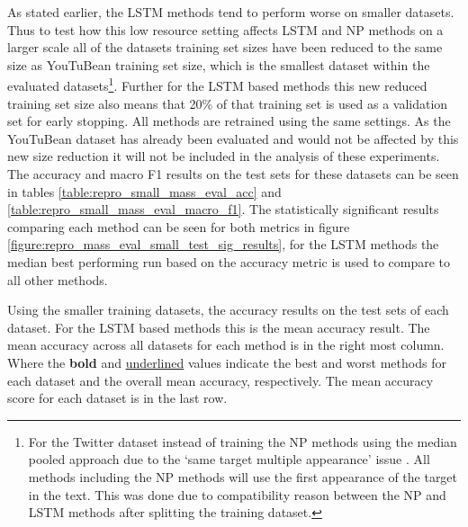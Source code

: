 As stated earlier, the LSTM methods tend to perform worse on smaller datasets. Thus to test how this low resource setting affects LSTM and NP methods on a larger scale all of the datasets training set sizes have been reduced to the same size as YouTuBean training set size, which is the smallest dataset within the evaluated datasets\footnote{For the \citet{dong-etal-2014-adaptive} Twitter dataset instead of training the NP methods using the median pooled approach due to the `same target multiple appearance' issue \citet{wang-etal-2017-tdparse}. All methods including the NP methods will use the first appearance of the target in the text. This was done due to compatibility reason between the NP and LSTM methods after splitting the training dataset.}. Further for the LSTM based methods this new reduced training set size also means that 20\% of that training set is used as a validation set for early stopping. All methods are retrained using the same settings. As the YouTuBean dataset has already been evaluated and would not be affected by this new size reduction it will not be included in the analysis of these experiments. The accuracy and macro F1 results on the test sets for these datasets can be seen in tables \ref{table:repro_small_mass_eval_acc} and \ref{table:repro_small_mass_eval_macro_f1}. The statistically significant results comparing each method can be seen for both metrics in figure \ref{figure:repro_mass_eval_small_test_sig_results}, for the LSTM methods the median best performing run based on the accuracy metric is used to compare to all other methods.


\begin{table}[!h]
    \centering
    
    \caption{Using the smaller training datasets, the accuracy results on the test sets of each dataset. For the LSTM based methods this is the mean accuracy result. The mean accuracy across all datasets for each method is in the right most column. Where the \textbf{bold} and \underline{underlined} values indicate the best and worst methods for each dataset and the overall mean accuracy, respectively. The mean accuracy score for each dataset is in the last row.}
    \label{table:repro_small_mass_eval_acc}
\end{table}

